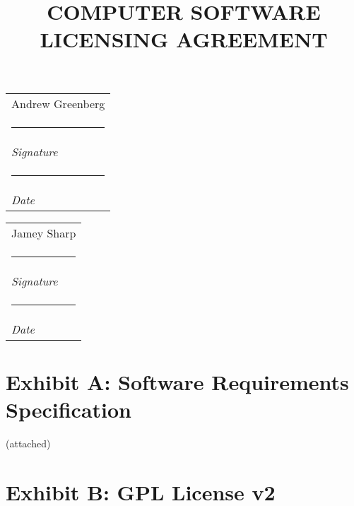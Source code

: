 \documentclass[letterpaper]{article}
\author{}
\title{ COMPUTER SOFTWARE LICENSING AGREEMENT }
\makeatletter
\newcommand{\namesigdate}[2][5cm]{%
  \begin{tabular}{@{}p{#1}@{}}
    #2 \\[2\normalbaselineskip] \hrule \\[0pt]
    {\small \textit{Signature}} \\[2\normalbaselineskip] \hrule \\[0pt]
    {\small \textit{Date}}
  \end{tabular}
}
\makeatother
\begin{document}
\maketitle


\bigskip
\bigskip
\bigskip

\namesigdate{Andrew Greenberg} \hfill \namesigdate{Jamey Sharp}

\newpage

\section{Exhibit A: Software Requirements Specification}
(attached)

\section{Exhibit B: GPL License v2}


\end{document}
